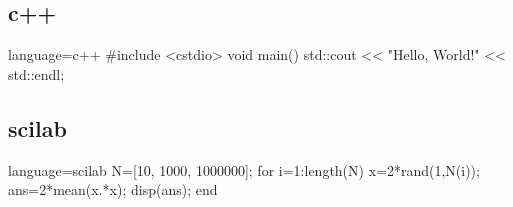 \documentclass[../main]{subfiles}
\begin{document}
\subsection{c++}

\begin{Code}{language=c++}
#include <cstdio>
void main() {
    std::cout << "Hello, World!" << std::endl;
}
\end{Code}

\subsection{scilab}

\begin{NCode}{language=scilab}
N=[10, 1000, 1000000];
for i=1:length(N)
	x=2*rand(1,N(i));
	ans=2*mean(x.*x);
	disp(ans);
end
\end{NCode}

\end{document}
